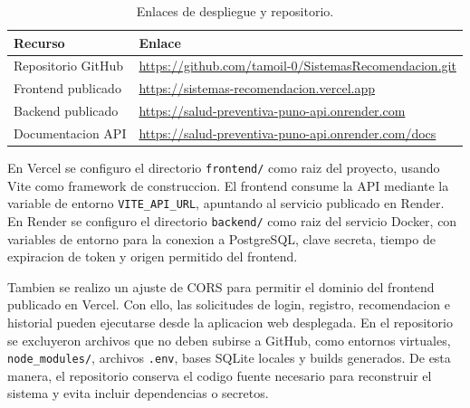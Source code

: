 \documentclass[12pt,a4paper]{article}
\begin{document}
\begin{table}[H]
\centering
\caption{Enlaces de despliegue y repositorio.}
\label{tab:despliegue}
\small
\begin{tabular}{p{3.7cm}p{8.7cm}}
\toprule
Recurso & Enlace \\ 
\midrule
Repositorio GitHub & \url{https://github.com/tamoil-0/SistemasRecomendacion.git} \\
Frontend publicado & \url{https://sistemas-recomendacion.vercel.app} \\
Backend publicado & \url{https://salud-preventiva-puno-api.onrender.com} \\
Documentacion API & \url{https://salud-preventiva-puno-api.onrender.com/docs} \\
\bottomrule
\end{tabular}
\end{table}

En Vercel se configuro el directorio \texttt{frontend/} como raiz del proyecto, usando Vite como framework de construccion. El frontend consume la API mediante la variable de entorno \texttt{VITE\_API\_URL}, apuntando al servicio publicado en Render. En Render se configuro el directorio \texttt{backend/} como raiz del servicio Docker, con variables de entorno para la conexion a PostgreSQL, clave secreta, tiempo de expiracion de token y origen permitido del frontend.

Tambien se realizo un ajuste de CORS para permitir el dominio del frontend publicado en Vercel. Con ello, las solicitudes de login, registro, recomendacion e historial pueden ejecutarse desde la aplicacion web desplegada. En el repositorio se excluyeron archivos que no deben subirse a GitHub, como entornos virtuales, \texttt{node\_modules/}, archivos \texttt{.env}, bases SQLite locales y builds generados. De esta manera, el repositorio conserva el codigo fuente necesario para reconstruir el sistema y evita incluir dependencias o secretos.
\end{document}
